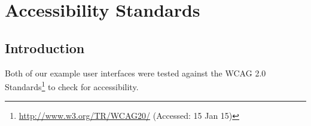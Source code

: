 \chapter{Accessibility Standards} 
\label{Chapter:Accessibility Standards}

\begin{preamble}
\end{preamble}

\section{Introduction}

Both of our example user interfaces were tested against the \gls{WCAG} 2.0 Standards\footnote{\url{http://www.w3.org/TR/WCAG20/} (Accessed: 15 Jan 15)} to check for accessibility.

